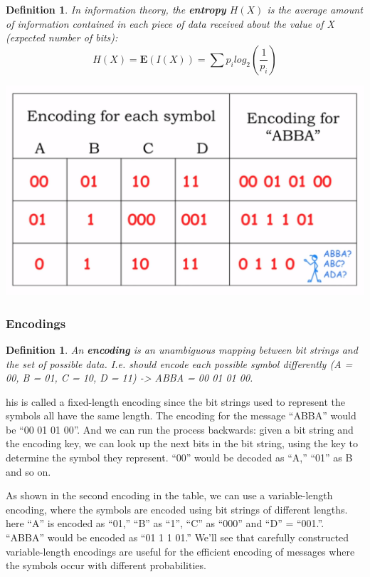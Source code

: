 \documentclass[a4paper,twoside]{article}
\newtheorem{definition}[theorem]{Definition}
\numberwithin{equation}{section}
\begin{document}
\begin{definition}
    In information theory, the \textbf{entropy} $H(X)$ is the average amount of information contained
    in each piece of data received about the value of X (expected number of bits):
    \begin{equation}
        H(X) = \mathbf{E}(I(X)) = \sum p_i log_2(\dfrac{1}{p_i})
    \end{equation}
\end{definition}

\begin{center}
    \includegraphics[scale=0.2]{assets/encodings.png}
\end{center}

\subsubsection{Encodings}

\begin{definition}
    An \textbf{encoding} is an unambiguous mapping between bit strings and the set of possible data.
     I.e. should encode each possible symbol differently (A = 00, B = 01, C = 10, D = 11) ->
     ABBA = 00 01 01 00.
\end{definition}

his is called a fixed-length encoding since the bit strings used to represent the symbols all have the
same length. The encoding for the message “ABBA” would be “00 01 01 00”. And we can run the process
 backwards: given a bit string and the encoding key, we can look up the next bits in the bit string,
 using the key to determine the symbol they represent. “00” would be decoded as “A,” “01” as B and so on.

As shown in the second encoding in the table, we can use a variable-length encoding, where the symbols
are encoded using bit strings of different lengths. here “A” is encoded as “01,” “B” as “1”, “C” as “000”
and “D” = “001.”. “ABBA” would be encoded as “01 1 1 01.” We'll see that carefully constructed variable-length
 encodings are useful for the efficient encoding of messages where the symbols occur with different
 probabilities.
\end{document}
